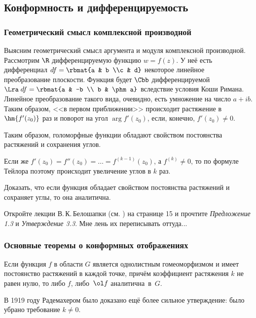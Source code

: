 \documentclass[a4paper]{article}
\begin{document}
\subsection{Конформность и дифференцируемость}

\subsubsection{Геометрический смысл комплексной производной}

Выясним геометрический смысл аргумента и модуля комплексной производной. Рассмотрим $\R$ дифференцируемую функцию
$w= f(z)$. У неё есть дифференциал $df = \rbmat{a & b \\c & d}$ некоторое линейное преобразование плоскости.
Функция будет $\Cbb$ дифференцируемой $\Lra \; df = \rbmat{a & -b \\ b & \phm a}$ вследствие условия Коши Римана.
Линейное преобразование такого вида, очевидно, есть умножение на число $a+ib$. Таким образом, <<в первом приближении>>
происходит растяжение в $\hm{f'(z_0)}$ раз и поворот на угол $\arg f'(z_0)$, если, конечно, $f'(z_0)\neq 0$.

Таким образом, голоморфные функции обладают свойством постоянства растяжений и сохранения углов.

Если же $f'(z_0) = f''(z_0) = \ldots = f^{(k-1)}(z_0)$, а $f^{(k)}\neq 0$, то по формуле Тейлора
поэтому происходит увеличение углов в $k$ раз.

\begin{problem}
Доказать, что если функция обладает свойством постоянства растяжений и сохраняет углы, то она аналитична.
\end{problem}
\begin{solution}
Откройте лекции В.\,К.\,Белошапки (см. \dmvnwebsite) на странице 15 и прочтите \emph{Предложение 1.3} и \emph{Утверждение 3.3}.
Мне лень их переписывать оттуда...
\end{solution}

\subsubsection{Основные теоремы о конформных отображениях}

\begin{theorem}[Х.\,Бор, 1918 г.]
Если функция $f$ в области $G$ является однолистным гомеоморфизмом и имеет постоянство растяжений в каждой точке, причём
коэффициент растяжения $k$ не равен нулю, то либо $f$, либо~$\ol f$ аналитична~в~$G$.
\end{theorem}
В 1919 году Радемахером было доказано ещё более сильное утверждение: было убрано требование $k\neq 0$.
\end{document}
